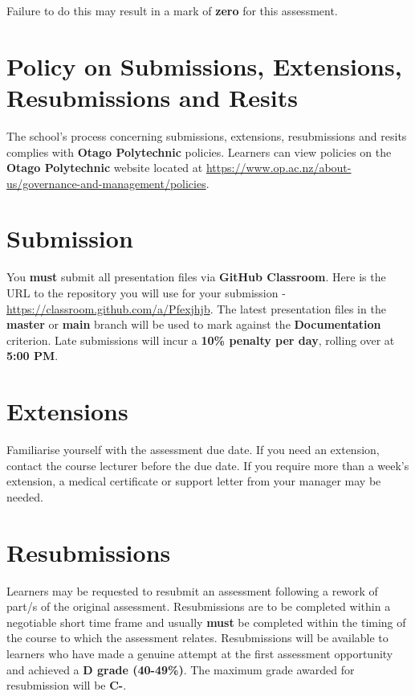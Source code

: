 \documentclass{article}
\begin{document}
 Failure to do this may result in a mark of \textbf{zero} for this assessment.

\section*{Policy on Submissions, Extensions, Resubmissions and Resits}
The school's process concerning submissions, extensions, resubmissions and resits complies with \textbf{Otago Polytechnic} policies. Learners can view policies on the \textbf{Otago Polytechnic} website located at \href{https://www.op.ac.nz/about-us/governance-and-management/policies}{https://www.op.ac.nz/about-us/governance-and-management/policies}.

\section*{Submission}
You \textbf{must} submit all presentation files via \textbf{GitHub Classroom}. Here is the URL to the repository you will use for your submission - \href{https://classroom.github.com/a/Pfexjhjb}{https://classroom.github.com/a/Pfexjhjb}. The latest presentation files in the \textbf{master} or \textbf{main} branch will be used to mark against the \textbf{Documentation} criterion. Late submissions will incur a \textbf{10\% penalty per day}, rolling over at \textbf{5:00 PM}.

\section*{Extensions}
Familiarise yourself with the assessment due date. If you need an extension, contact the course lecturer before the due date. If you require more than a week's extension, a medical certificate or support letter from your manager may be needed.

\section*{Resubmissions}
Learners may be requested to resubmit an assessment following a rework of part/s of the original assessment. Resubmissions are to be completed within a negotiable short time frame and usually \textbf{must} be completed within the timing of the course to which the assessment relates. Resubmissions will be available to learners who have made a genuine attempt at the first assessment opportunity and achieved a \textbf{D grade (40-49\%)}. The maximum grade awarded for resubmission will be \textbf{C-}.
\end{document}
